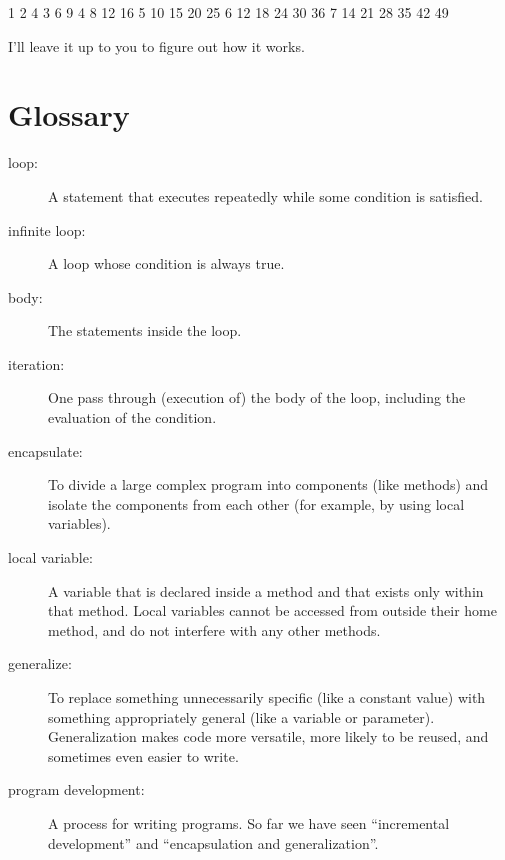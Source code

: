 \documentclass[12pt]{book}
\theoremstyle{exercise}
\begin{document}
\begin{verbatimtab}
1
2   4
3   6   9
4   8   12   16
5   10   15   20   25
6   12   18   24   30   36
7   14   21   28   35   42   49
\end{verbatimtab}
%
I'll leave it up to you to figure out how it works.


\section{Glossary}

\begin{description}

\item[loop:]  A statement that executes repeatedly while
some condition is satisfied.

\item[infinite loop:]  A loop whose condition is always true.

\item[body:]  The statements inside the loop.

\item[iteration:]  One pass through (execution of) the body
of the loop, including the evaluation of the condition.

\item[encapsulate:]  To divide a large complex program into
components (like methods) and isolate the components from
each other (for example, by using local variables).

\item[local variable:]  A variable that is declared inside
a method and that exists only within that method.  Local variables
cannot be accessed from outside their home method, and do not
interfere with any other methods.

\item[generalize:]  To replace something unnecessarily specific
(like a constant value) with something appropriately general
(like a variable or parameter).  Generalization makes code more
versatile, more likely to be reused, and sometimes even easier
to write.

\item[program development:] A process for writing programs.
  So far we have seen ``incremental development'' and ``encapsulation
  and generalization''.


\end{description}
\end{document}
